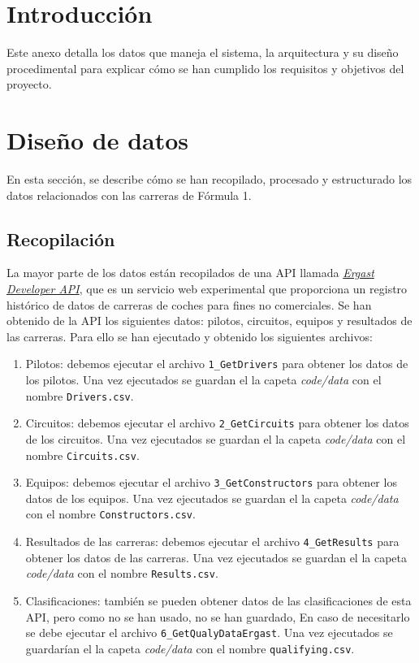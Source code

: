 
\section{Introducción}

Este anexo detalla los datos que maneja el sistema, la arquitectura y su diseño procedimental para explicar cómo se han cumplido los requisitos y objetivos del proyecto.

\section{Diseño de datos}

En esta sección, se describe cómo se han recopilado, procesado y estructurado los datos relacionados con las carreras de Fórmula 1.

\subsection{Recopilación}

La mayor parte de los datos están recopilados de una API llamada \href{https://ergast.com/mrd/}{\textit{Ergast Developer API}}, que es un servicio web experimental que proporciona un registro histórico de datos de carreras de coches para fines no comerciales. Se han obtenido de la API los siguientes datos: pilotos, circuitos, equipos y resultados de las carreras. Para ello se han ejecutado y obtenido los siguientes archivos:
\begin{enumerate}
    \item Pilotos: debemos ejecutar el archivo \texttt{1\_GetDrivers} para obtener los datos de los pilotos. Una vez ejecutados se guardan el la capeta \textit{code/data} con el nombre \texttt{Drivers.csv}.
    \item Circuitos: debemos ejecutar el archivo \texttt{2\_GetCircuits} para obtener los datos de los circuitos. Una vez ejecutados se guardan el la capeta \textit{code/data} con el nombre \texttt{Circuits.csv}.
    \item Equipos: debemos ejecutar el archivo \texttt{3\_GetConstructors} para obtener los datos de los equipos. Una vez ejecutados se guardan el la capeta \textit{code/data} con el nombre \texttt{Constructors.csv}.
    \item Resultados de las carreras: debemos ejecutar el archivo \texttt{4\_GetResults} para obtener los datos de las carreras. Una vez ejecutados se guardan el la capeta \textit{code/data} con el nombre \texttt{Results.csv}.
    \item Clasificaciones: también se pueden obtener datos de las clasificaciones de esta API, pero como no se han usado, no se han guardado, En caso de necesitarlo se debe ejecutar el archivo \texttt{6\_GetQualyDataErgast}. Una vez ejecutados se guardarían el la capeta \textit{code/data} con el nombre \texttt{qualifying.csv}.
\end{enumerate}

